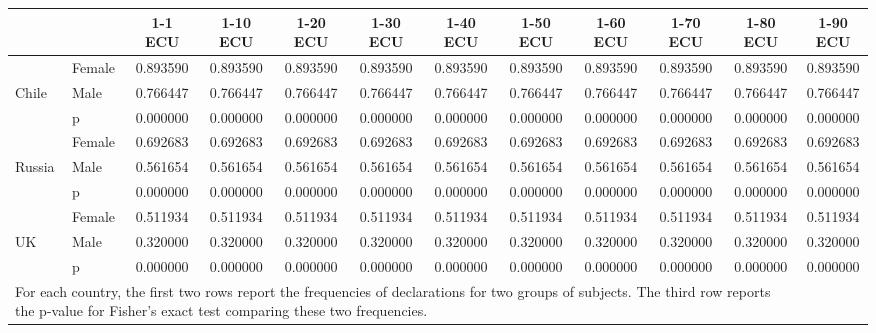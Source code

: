 \def\sym#1{\ifmmode^{#1}\else\(^{#1}\)\fi}
\begin{tabular}{|ll|cccccccccc|}
\hline\hline
&&1-1 ECU&1-10 ECU&1-20 ECU&1-30 ECU&1-40 ECU&1-50 ECU&1-60 ECU&1-70 ECU&1-80 ECU&1-90 ECU\\
\hline
&Female& 0.893590& 0.893590& 0.893590& 0.893590& 0.893590& 0.893590& 0.893590& 0.893590& 0.893590& 0.893590\\
Chile&Male& 0.766447& 0.766447& 0.766447& 0.766447& 0.766447& 0.766447& 0.766447& 0.766447& 0.766447& 0.766447\\
&p& 0.000000& 0.000000& 0.000000& 0.000000& 0.000000& 0.000000& 0.000000& 0.000000& 0.000000& 0.000000\\
\hline&Female& 0.692683& 0.692683& 0.692683& 0.692683& 0.692683& 0.692683& 0.692683& 0.692683& 0.692683& 0.692683\\
Russia&Male& 0.561654& 0.561654& 0.561654& 0.561654& 0.561654& 0.561654& 0.561654& 0.561654& 0.561654& 0.561654\\
&p& 0.000000& 0.000000& 0.000000& 0.000000& 0.000000& 0.000000& 0.000000& 0.000000& 0.000000& 0.000000\\
\hline&Female& 0.511934& 0.511934& 0.511934& 0.511934& 0.511934& 0.511934& 0.511934& 0.511934& 0.511934& 0.511934\\
UK&Male& 0.320000& 0.320000& 0.320000& 0.320000& 0.320000& 0.320000& 0.320000& 0.320000& 0.320000& 0.320000\\
&p& 0.000000& 0.000000& 0.000000& 0.000000& 0.000000& 0.000000& 0.000000& 0.000000& 0.000000& 0.000000\\
\hline\multicolumn{11}{p{15cm}}{\tiny For each country, the first two rows report the frequencies of declarations for two groups of subjects. The third row reports the p-value for Fisher's exact test comparing these two frequencies.}\\
\end{tabular}
